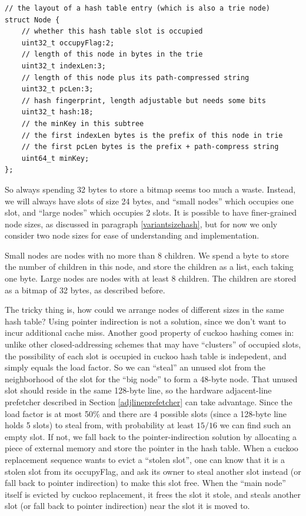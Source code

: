 \documentclass[11pt, usletter]{article}
\begin{document}
\singlespacing\begin{codebox}
\begin{verbatim}
// the layout of a hash table entry (which is also a trie node)
struct Node {
    // whether this hash table slot is occupied
    uint32_t occupyFlag:2; 
    // length of this node in bytes in the trie
    uint32_t indexLen:3;
    // length of this node plus its path-compressed string
    uint32_t pcLen:3;
    // hash fingerprint, length adjustable but needs some bits
    uint32_t hash:18;
    // the minKey in this subtree
    // the first indexLen bytes is the prefix of this node in trie
    // the first pcLen bytes is the prefix + path-compress string
    uint64_t minKey;
};  
\end{verbatim}
\end{codebox}\doublespacing

So always spending 32 bytes to store a bitmap seems too much a waste. 
Instead, we will always have slots of size 24 bytes, 
and ``small nodes'' which occupies one slot, and ``large nodes'' which occupies 2 slots. 
It is possible to have finer-grained node sizes, as discussed in paragraph \ref{variantsizehash}, 
but for now we only consider two node sizes for ease of understanding and implementation.

Small nodes are nodes with no more than 8 children.
We spend a byte to store the number of children in this node, 
and store the children as a list, each taking one byte. 
Large nodes are nodes with at least 8 children. 
The children are stored as a bitmap of 32 bytes, as described before.

The tricky thing is, how could we arrange nodes of different sizes in the same hash table?
Using pointer indirection is not a solution, since we don't want to incur additional cache miss. 
Another good property of cuckoo hashing comes in: 
unlike other closed-addressing schemes that may have ``clusters'' of occupied slots, 
the possibility of each slot is occupied in cuckoo hash table is indepedent, 
and simply equals the load factor. 
So we can ``steal'' an unused slot from the neighborhood of the slot for the ``big node'' to form a 48-byte node. 
That unused slot should reside in the same 128-byte line,
so the hardware adjacent-line prefetcher described in Section \ref{adjlineprefetcher} can take advantage.
Since the load factor is at most 50\% and there are 4 possible slots (since a 128-byte line holds 5 slots) to steal from, 
with probability at least $15/16$ we can find such an empty slot. If not, we fall back to the pointer-indirection solution
by allocating a piece of external memory and store the pointer in the hash table. 
When a cuckoo replacement sequence wants to evict a ``stolen slot'', one can know that it is a stolen slot 
from its occupyFlag, and ask its owner to steal another slot instead (or fall back to pointer indirection) to make this slot free.  
When the ``main node'' itself is evicted by cuckoo replacement, it frees the slot it stole, 
and steals another slot (or fall back to pointer indirection) near the slot it is moved to.
 
\end{document}
